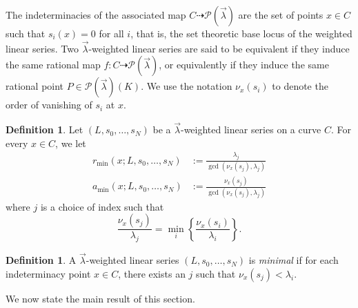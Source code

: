 \documentclass[a4paper,12pt]{amsart}
\theoremstyle{definition}
\newtheorem{defn}[thm]{Definition}
\newcommand{\Pcv}{\mathcal{P}(\vec{\lambda})}
\begin{document}
	The indeterminacies of the associated map $C\dasharrow\Pcv$ are the set of points $x \in C$ such that $s_i(x) = 0$ for all $i$, that is, the set theoretic base locus of the weighted linear series. Two $\vec{\lambda}$-weighted linear series are said to be equivalent if they induce the same rational map $f \colon C \dasharrow \mathcal{P}(\vec{\lambda})$, or equivalently if they induce the same rational point $P \in \Pcv(K)$. We use the notation $\nu_x(s_i)$ to denote the order of vanishing of $s_i$ at $x$.
	
	
	\begin{defn}\label{def:rmin-for-any-lin-ser}
		Let $(L, s_0, \ldots, s_N)$ be a $\vec{\lambda}$-weighted linear series on a curve $C$. For every $x\in C$, we let
		\begin{align*}
			r_{\min}(x;L,s_0,\dots,s_N)&:=\frac{\lambda_j}{\gcd(\nu_x(s_j),\lambda_j)} \\
			a_{\min}(x;L,s_0,\dots,s_N)&:=\frac{\nu_x(s_j)}{\gcd(\nu_x(s_j),\lambda_j)}
		\end{align*}
		where $j$ is a choice of index such that
		\[
		\frac{\nu_x(s_j)}{\lambda_j}=\min_i\left\{\frac{\nu_x(s_i)}{\lambda_i}\right\}.
		\]   
	\end{defn}
	
	\begin{defn}\label{def:mimal-wted-lin-ser} A $\vec{\lambda}$-weighted linear series $(L, s_0, \ldots, s_N)$ is \emph{minimal} if for each indeterminacy point $x \in C$, there exists an $j$ such that $\nu_x(s_j) < \lambda_i$.
	\end{defn} 
	
	We now state the main result of this section.
	
\end{document}

